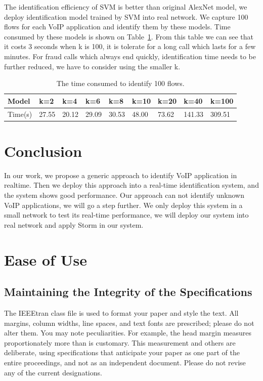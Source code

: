 \documentclass[conference]{IEEEtran}
\begin{document}
The identification efficiency of SVM is better than original AlexNet model, we deploy identification model trained by SVM into real network. We capture 100 flows for each VoIP application and identify them by these models. Time consumed by these models is shown on Table~\ref{tab:time4folws}. From this table we can see that it costs 3 seconds when k is 100, it is tolerate for a long call which lasts for a few minutes. For fraud calls which always end quickly, identification time needs to be further reduced, we have to consider using the smaller k.
\begin{table}
  \caption{The time consumed to identify 100 flows.}
  \label{tab:time4folws}
  \centering
  \begin{tabular}{p{1cm}p{1cm}p{1cm}p{1cm}p{1cm}p{1cm}p{1cm}p{1cm}p{1cm}}
    \hline
    Model & k=2 &k=4 &k=6&k=8&k=10&k=20&k=40&k=100\\
    \hline
    Time(s)      & 27.55  & 20.12  &29.09&30.53&48.00&73.62&141.33&309.51  \\
    \hline
  \end{tabular}
\end{table}

\section{Conclusion}
\label{sec:conclusion}
In our work, we propose a generic approach to identify VoIP application in realtime. Then we deploy this approach into a real-time identification system, and the system shows good performance. Our approach can not identify unknown VoIP applications, we will go a step further. We only deploy this system in a small network to test its real-time performance, we will deploy our system into real network and apply Storm in our system.

\section{Ease of Use}

\subsection{Maintaining the Integrity of the Specifications}

The IEEEtran class file is used to format your paper and style the text. All margins,
column widths, line spaces, and text fonts are prescribed; please do not
alter them. You may note peculiarities. For example, the head margin
measures proportionately more than is customary. This measurement
and others are deliberate, using specifications that anticipate your paper
as one part of the entire proceedings, and not as an independent document.
Please do not revise any of the current designations.
\end{document}
